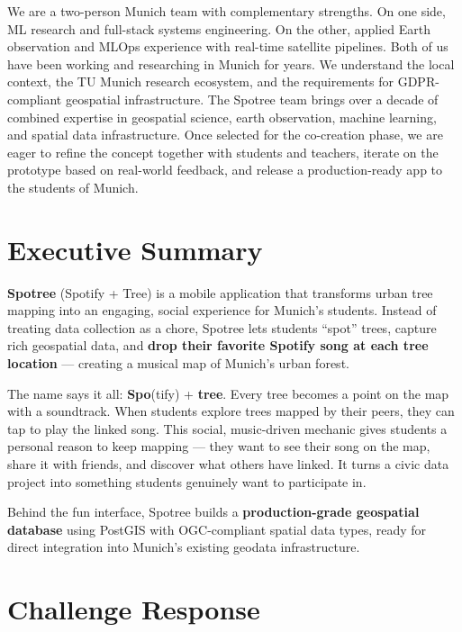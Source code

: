 \documentclass[11pt,a4paper]{article}
\begin{document}
\noindent
We are a two-person Munich team with complementary strengths. On one side, ML research and full-stack systems engineering. On the other, applied Earth observation and MLOps experience with real-time satellite pipelines. Both of us have been working and researching in Munich for years. We understand the local context, the TU Munich research ecosystem, and the requirements for GDPR-compliant geospatial infrastructure. The Spotree team brings over a decade of combined expertise in geospatial science, earth observation, machine learning, and spatial data infrastructure. Once selected for the co-creation phase, we are eager to refine the concept together with students and teachers, iterate on the prototype based on real-world feedback, and release a production-ready app to the students of Munich.

\clearpage
\section{Executive Summary}

\textbf{Spotree} (Spotify + Tree) is a mobile application that transforms urban tree mapping into an engaging, social experience for Munich's students. Instead of treating data collection as a chore, Spotree lets students ``spot'' trees, capture rich geospatial data, and \textbf{drop their favorite Spotify song at each tree location} --- creating a musical map of Munich's urban forest.

The name says it all: \textbf{Spo}(tify) + \textbf{tree}. Every tree becomes a point on the map with a soundtrack. When students explore trees mapped by their peers, they can tap to play the linked song. This social, music-driven mechanic gives students a personal reason to keep mapping --- they want to see their song on the map, share it with friends, and discover what others have linked. It turns a civic data project into something students genuinely want to participate in.

Behind the fun interface, Spotree builds a \textbf{production-grade geospatial database} using PostGIS with OGC-compliant spatial data types, ready for direct integration into Munich's existing geodata infrastructure.

\clearpage
\section{Challenge Response}
\end{document}
